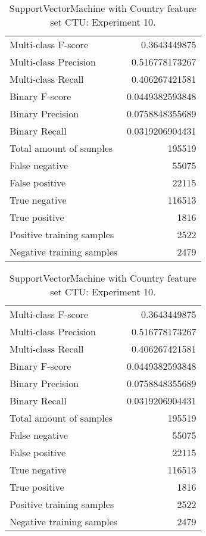\begin{table}[H]
\begin{minipage}{0.5\textwidth}
\caption{SupportVectorMachine with Country feature set CTU: Experiment 9.}
\centering
\begin{tabular}{l r}
\toprule
Multi-class F-score & 0.3643449875 \\
Multi-class Precision & 0.516778173267 \\
Multi-class Recall & 0.406267421581 \\
\midrule
Binary F-score & 0.0449382593848 \\
Binary Precision & 0.0758848355689 \\
Binary Recall & 0.0319206904431 \\
\midrule
Total amount of samples & 195519 \\
False negative & 55075 \\
False positive & 22115 \\
True negative & 116513 \\
True positive & 1816 \\
\midrule
Positive training samples & 2522 \\
Negative training samples & 2479 \\
\bottomrule
\end{tabular}
\end{minipage}
\hfillx
\begin{minipage}{0.5\textwidth}
\caption{SupportVectorMachine with Country feature set CTU: Experiment 10.}
\centering
\begin{tabular}{l r}
\toprule
Multi-class F-score & 0.3643449875 \\
Multi-class Precision & 0.516778173267 \\
Multi-class Recall & 0.406267421581 \\
\midrule
Binary F-score & 0.0449382593848 \\
Binary Precision & 0.0758848355689 \\
Binary Recall & 0.0319206904431 \\
\midrule
Total amount of samples & 195519 \\
False negative & 55075 \\
False positive & 22115 \\
True negative & 116513 \\
True positive & 1816 \\
\midrule
Positive training samples & 2522 \\
Negative training samples & 2479 \\
\bottomrule
\end{tabular}
\end{minipage}
\end{table}
